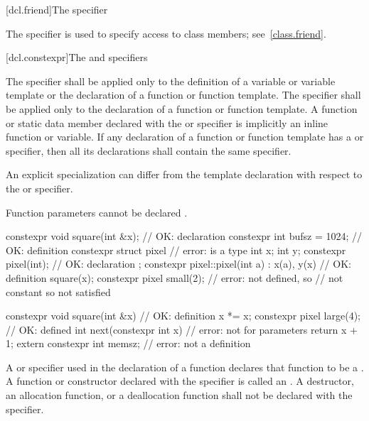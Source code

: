 [dcl.friend]{The  specifier}%

\pnum
The  specifier is used to specify access to class members;
see~\ref{class.friend}.

[dcl.constexpr]{The  and  specifiers}%

\pnum
The  specifier shall be applied only to
the definition of a variable or variable template or
the declaration of a function or function template.
The  specifier shall be applied only to
the declaration of a function or function template.
A function or static data member
declared with the  or  specifier
is implicitly an inline function or variable.
If any declaration of a function or function template has
a  or  specifier,
then all its declarations shall contain the same specifier.
\begin{note}
An explicit specialization can differ from the template declaration
with respect to the  or  specifier.
\end{note}
\begin{note}
Function parameters cannot be declared .
\end{note}
\begin{example}
\begin{codeblock}
constexpr void square(int &x);  // OK: declaration
constexpr int bufsz = 1024;     // OK: definition
constexpr struct pixel {        // error:  is a type
  int x;
  int y;
  constexpr pixel(int);         // OK: declaration
};
constexpr pixel::pixel(int a)
  : x(a), y(x)                  // OK: definition
  { square(x); }
constexpr pixel small(2);       // error:  not defined, so 
                                // not constant so  not satisfied

constexpr void square(int &x) { // OK: definition
  x *= x;
}
constexpr pixel large(4);       // OK:  defined
int next(constexpr int x) {     // error: not for parameters
     return x + 1;
}
extern constexpr int memsz;     // error: not a definition
\end{codeblock}
\end{example}

\pnum
A  or  specifier
used in the declaration of a function
declares that function to be
a .
A function or constructor declared with the  specifier
is called an .
A destructor, an allocation function, or a deallocation function
shall not be declared with the  specifier.

